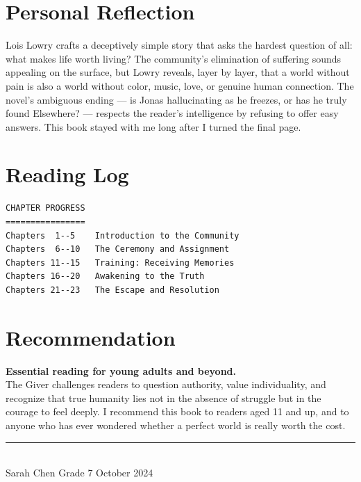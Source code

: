 \documentclass[11pt]{article}
\begin{document}
\vspace{6pt}

\section{Personal Reflection}

Lois Lowry crafts a deceptively simple story that asks the hardest question of all: what makes life worth living? The community's elimination of suffering sounds appealing on the surface, but Lowry reveals, layer by layer, that a world without pain is also a world without color, music, love, or genuine human connection. The novel's ambiguous ending --- is Jonas hallucinating as he freezes, or has he truly found Elsewhere? --- respects the reader's intelligence by refusing to offer easy answers. This book stayed with me long after I turned the final page.

\vspace{6pt}

\section{Reading Log}

\begin{lstlisting}[basicstyle=\ttfamily\small\color{textgray}, backgroundcolor=\color{accent!4}]
CHAPTER PROGRESS
================
Chapters  1--5    Introduction to the Community
Chapters  6--10   The Ceremony and Assignment
Chapters 11--15   Training: Receiving Memories
Chapters 16--20   Awakening to the Truth
Chapters 21--23   The Escape and Resolution
\end{lstlisting}

\vspace{6pt}

\section{Recommendation}

{\large\bfseries\color{accent}Essential reading for young adults and beyond.}\\ The Giver challenges readers to question authority, value individuality, and recognize that true humanity lies not in the absence of struggle but in the courage to feel deeply. I recommend this book to readers aged 11 and up, and to anyone who has ever wondered whether a perfect world is really worth the cost.

\vspace{8pt}
\begin{flushright}
{\color{accent}\rule{0.3\textwidth}{0.5pt}}\\[2pt]
{\small\color{accentlight}Sarah Chen \quad\textbullet\quad Grade 7 \quad\textbullet\quad October 2024}
\end{flushright}
\end{document}
